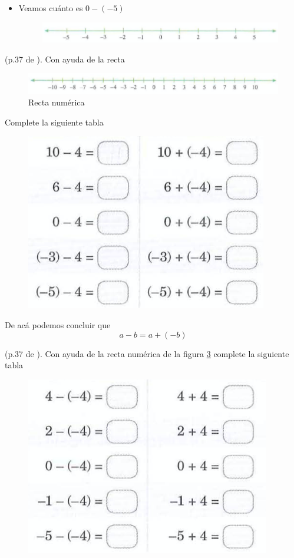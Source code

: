 \begin{ejemplo}
\begin{itemize}
\begin{figure}[H]
					\label{DM7A_p38_2b}
				\end{figure}
		\item Veamos cuánto es $0-(-5)$		
				\begin{figure}[H]
					\centering
					\includegraphics[width=0.7\linewidth]{Algebra/imgs/DM7A_p38_2c}
					\label{DM7A_p38_2c}
				\end{figure}					
	\end{itemize}
\end{ejemplo}

\begin{ejemplo}
(p.37 de \cite{Dimensions_Math_7A}). Con ayuda de la recta
		\begin{figure}[H]
			\centering
			\includegraphics[width=0.7\linewidth]{Algebra/imgs/recta_numerica_larga}
			\caption{Recta numérica}
			\label{recta_numerica_larga}
		\end{figure}
Complete la siguiente tabla 
		\begin{figure}[H]
			\centering
			\includegraphics[width=0.5\linewidth]{Algebra/imgs/DM7A_p39_3a}
			\caption{}
			\label{DM7A_p39_3a}
		\end{figure}
\end{ejemplo}

De acá podemos concluir que 
\[
		a-b=a+(-b)
\]

\begin{ejemplo}
	(p.37 de \cite{Dimensions_Math_7A}). Con ayuda de la recta numérica de la figura \ref{recta_numerica_larga} complete la siguiente tabla 
	\begin{figure}[H]
		\centering
		\includegraphics[width=0.5\linewidth]{Algebra/imgs/DM7A_p39_3b}
		\caption{}
		\label{DM7A_p39_3b}
	\end{figure}
\end{ejemplo}

